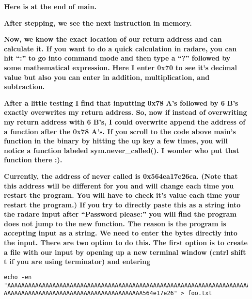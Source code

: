 \documentclass[letterpaper]{article}
\newcommand{\sitfig}[3]{
\begin{figure}[H]
\centering
\makebox[\textwidth][c]{
#2
}
\label{#1}
\end{figure}
}
\newcommand{\sitgfx}[4][scale=1.0]{
\sitfig{#3}{\texttt{[image: \#2]}}{#4}
}
\begin{document}
\textbf{Here is at the end of main.}\newline
  
\sitgfx[width=5.8335in,height=3.6457in]{reversing-img094.png}{fig:unk}{TODO CAPTION}
 

\textbf{After stepping, we see the next instruction in memory.\newline
}  
\sitgfx[width=5.8335in,height=3.6457in]{reversing-img095.png}{fig:unk}{TODO CAPTION}
 

\textbf{Now, we know the exact location of our return address and can calculate it. If you want to do a quick
calculation in radare, you can hit ``:'' to go into command mode and then type a ``?'' followed by some mathematical
expression. Here I enter 0x70 to see it's decimal value but also you can enter in addition, multiplication, and
subtraction.}

  
\sitgfx[width=5.8335in,height=3.6457in]{reversing-img089.png}{fig:unk}{TODO CAPTION}
 

\textbf{After a little testing I find that inputting 0x78 A's followed by 6 B's exactly overwrites my return address.
So, now if instead of overwriting my return address with 6 B's, I could overwrite append the address of a function
after the 0x78 A's. If you scroll to the code above main's function in the binary by hitting the up key a few times,
you will notice a function labeled sym.never\_called(). I wonder who put that function there :).}

  
\sitgfx[width=5.8335in,height=3.6457in]{reversing-img096.png}{fig:unk}{TODO CAPTION}
 

\textbf{Currently, the address of never called is 0x564ea17e26ca. (Note that this address will be different for you and
will change each time you restart the program. You will have to check it's value each time your restart the program.)
If you try to directly paste this as a string into the radare input after ``Password please:'' you will find the
program does not jump to the new function. The reason is the program is accepting input as a string. We need to enter
the bytes directly into the input. There are two option to do this. The first option is to create a file with our input
by opening up a new terminal window (cntrl shift t if you are using terminator) and entering}

\begin{verbatim}
echo -en "AAAAAAAAAAAAAAAAAAAAAAAAAAAAAAAAAAAAAAAAAAAAAAAAAAAAAAAAAAAAAAAAAAAAAAAA
AAAAAAAAAAAAAAAAAAAAAAAAAAAAAAAAAAAAAAAA564e17e26" > foo.txt
\end{verbatim}
\end{document}
